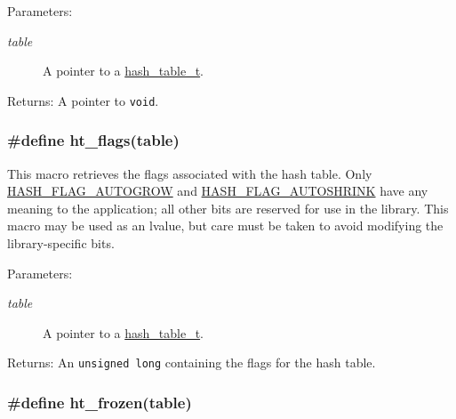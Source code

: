 \begin{Desc}
\item[Parameters:]
\begin{description}
\item[{\em table}]A pointer to a \hyperlink{group__dbprim__hash_a0}{hash\_\-table\_\-t}.\end{description}
\end{Desc}
\begin{Desc}
\item[Returns:]A pointer to {\tt void}. \end{Desc}
\hypertarget{group__dbprim__hash_a20}{
\subsubsection[ht\_\-flags]{\setlength{\rightskip}{0pt plus 5cm}\#define ht\_\-flags(table)}}
\label{group__dbprim__hash_a20}


This macro retrieves the flags associated with the hash table. Only \hyperlink{group__dbprim__hash_a16}{HASH\_\-FLAG\_\-AUTOGROW} and \hyperlink{group__dbprim__hash_a17}{HASH\_\-FLAG\_\-AUTOSHRINK} have any meaning to the application; all other bits are reserved for use in the library. This macro may be used as an lvalue, but care must be taken to avoid modifying the library-specific bits.

\begin{Desc}
\item[Parameters:]
\begin{description}
\item[{\em table}]A pointer to a \hyperlink{group__dbprim__hash_a0}{hash\_\-table\_\-t}.\end{description}
\end{Desc}
\begin{Desc}
\item[Returns:]An {\tt unsigned long} containing the flags for the hash table. \end{Desc}
\hypertarget{group__dbprim__hash_a21}{
\subsubsection[ht\_\-frozen]{\setlength{\rightskip}{0pt plus 5cm}\#define ht\_\-frozen(table)}}
\label{group__dbprim__hash_a21}


